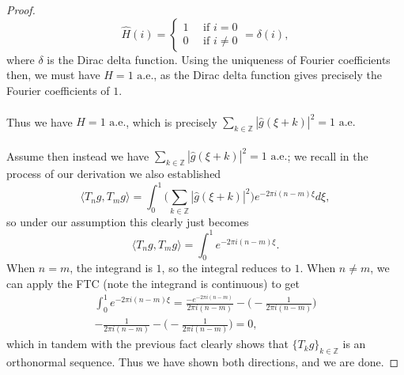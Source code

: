 \documentclass[12pt]{article}
\newenvironment{ex}[2][Exercise]{\begin{trivlist}
\item[\hskip \labelsep {\bfseries #1}\hskip \labelsep {\bfseries #2.}]}{\end{trivlist}}
\begin{document}
\begin{ex}{12}
\begin{proof}
        \begin{equation*}\hat{H}(i) = \begin{cases}
            1 \quad \text{ if } i = 0 \\
            0 \quad \text{ if } i \neq 0 
        \end{cases} = \delta(i), \end{equation*}
        where $\delta$ is the Dirac delta function. Using the uniqueness of Fourier coefficients then, we must have $H = 1 \text{ a.e.}$, as the Dirac delta function gives precisely the Fourier coefficients of $1$. \\ \\
        Thus we have $H = 1 \text{ a.e.}$, which is precisely $\sum_{k \in \mathbb{Z}} |\hat{g}(\xi + k)|^2 = 1 \text{ a.e.}$ \\ \\
        Assume then instead we have $\sum_{k \in \mathbb{Z}} |\hat{g}(\xi + k)|^2 = 1 \text{ a.e.}$; we recall in the process of our derivation we also established
        $$\langle T_ng, T_mg \rangle = \int_0^1 \Big ( \sum_{k \in \mathbb{Z}} |\hat{g}(\xi + k)|^2 \Big)e^{-2\pi i(n - m)\xi} d\xi,$$
        so under our assumption this clearly just becomes 
        $$\langle T_ng, T_mg \rangle = \int_0^1 e^{-2\pi i(n - m)\xi}.$$
        When $n = m$, the integrand is $1$, so the integral reduces to $1$. When $n \neq m$, we can apply the FTC (note the integrand is continuous) to get
        \begin{align*}\int_0^1 e^{-2\pi i(n - m)\xi} = \frac{-e^{-2\pi i (n - m)}}{2 \pi i (n -m)} - \Bigg ( - \frac{1}{2\pi i (n-m)} \Bigg) \\
            - \frac{1}{2\pi i (n-m)} - \Bigg ( - \frac{1}{2\pi i (n-m)} \Bigg ) = 0,
        \end{align*}
        which in tandem with the previous fact clearly shows that $\{T_kg\}_{k \in \mathbb{Z}}$ is an orthonormal sequence. Thus we have shown both directions, and we are done.
    \end{proof}
\end{ex}
\end{document}
